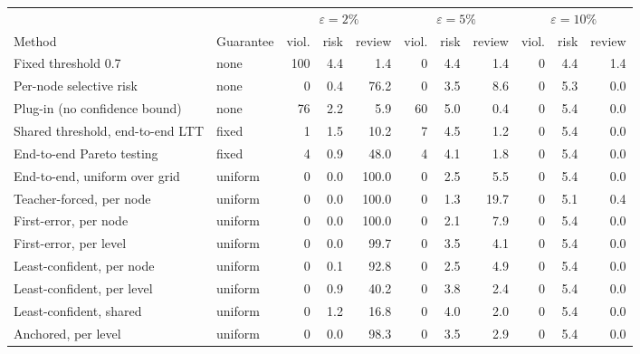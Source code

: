 \begin{tabular}{llrrrrrrrrr}
\toprule
 & & \multicolumn{3}{c}{$\varepsilon=2\%$} & \multicolumn{3}{c}{$\varepsilon=5\%$} & \multicolumn{3}{c}{$\varepsilon=10\%$} \\
\cmidrule(lr){3-5}\cmidrule(lr){6-8}\cmidrule(lr){9-11}
Method & Guarantee & viol. & risk & review & viol. & risk & review & viol. & risk & review \\
\midrule
Fixed threshold 0.7 & none & 100 & 4.4 & 1.4 & 0 & 4.4 & 1.4 & 0 & 4.4 & 1.4 \\
Per-node selective risk & none & 0 & 0.4 & 76.2 & 0 & 3.5 & 8.6 & 0 & 5.3 & 0.0 \\
Plug-in (no confidence bound) & none & 76 & 2.2 & 5.9 & 60 & 5.0 & 0.4 & 0 & 5.4 & 0.0 \\
\midrule
Shared threshold, end-to-end LTT & fixed & 1 & 1.5 & 10.2 & 7 & 4.5 & 1.2 & 0 & 5.4 & 0.0 \\
End-to-end Pareto testing & fixed & 4 & 0.9 & 48.0 & 4 & 4.1 & 1.8 & 0 & 5.4 & 0.0 \\
End-to-end, uniform over grid & uniform & 0 & 0.0 & 100.0 & 0 & 2.5 & 5.5 & 0 & 5.4 & 0.0 \\
\midrule
Teacher-forced, per node & uniform & 0 & 0.0 & 100.0 & 0 & 1.3 & 19.7 & 0 & 5.1 & 0.4 \\
First-error, per node & uniform & 0 & 0.0 & 100.0 & 0 & 2.1 & 7.9 & 0 & 5.4 & 0.0 \\
First-error, per level & uniform & 0 & 0.0 & 99.7 & 0 & 3.5 & 4.1 & 0 & 5.4 & 0.0 \\
\midrule
Least-confident, per node & uniform & 0 & 0.1 & 92.8 & 0 & 2.5 & 4.9 & 0 & 5.4 & 0.0 \\
Least-confident, per level & uniform & 0 & 0.9 & 40.2 & 0 & 3.8 & 2.4 & 0 & 5.4 & 0.0 \\
Least-confident, shared & uniform & 0 & 1.2 & 16.8 & 0 & 4.0 & 2.0 & 0 & 5.4 & 0.0 \\
Anchored, per level & uniform & 0 & 0.0 & 98.3 & 0 & 3.5 & 2.9 & 0 & 5.4 & 0.0 \\
\bottomrule
\end{tabular}
